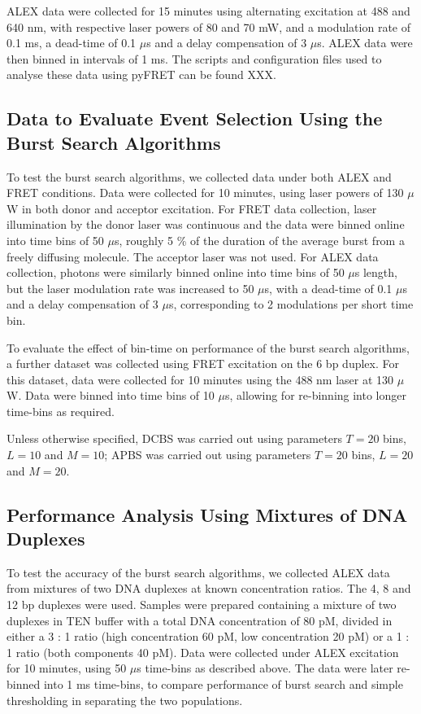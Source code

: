 ALEX data were collected for 15 minutes using alternating excitation at 488 and 640 nm, with respective laser powers of 80 and 70 mW, and a modulation rate of 0.1 ms, a dead-time of 0.1 $\mu$s and a delay compensation of 3 $\mu$s. ALEX data were then binned in intervals of 1 ms. The scripts and configuration files used to analyse these data using pyFRET can be found XXX.

\subsection*{Data to Evaluate Event Selection Using the Burst Search Algorithms}
To test the burst search algorithms, we collected data under both ALEX and FRET conditions. Data were collected for 10 minutes, using laser powers of 130 $\mu$W in both donor and acceptor excitation. For FRET data collection, laser illumination by the donor laser was continuous and the data were binned online into time bins of 50 $\mu$s, roughly 5 \% of the duration of the average burst from a freely diffusing molecule. The acceptor laser was not used. For ALEX data collection, photons were similarly binned online into time bins of 50 $\mu$s length, but the laser modulation rate was increased to 50 $\mu$s, with a dead-time of 0.1 $\mu$s and a delay compensation of 3 $\mu$s, corresponding to 2 modulations per short time bin. 

To evaluate the effect of bin-time on performance of the burst search algorithms, a further dataset was collected using FRET excitation on the 6 bp duplex. For this dataset, data were collected for 10 minutes using the 488 nm laser at 130 $\mu$W. Data were binned into time bins of 10 $\mu$s, allowing for re-binning into longer time-bins as required.

Unless otherwise specified, DCBS was carried out using parameters $T = 20$ bins, $L = 10$ and $M = 10$; APBS was carried out using parameters $T = 20$ bins, $L = 20$ and $M = 20$.

\subsection*{Performance Analysis Using Mixtures of DNA Duplexes}
To test the accuracy of the burst search algorithms, we collected ALEX data from mixtures of two DNA duplexes at known concentration ratios. The 4, 8 and 12 bp duplexes were used. Samples were prepared containing a mixture of two duplexes in TEN buffer with a total DNA concentration of 80 pM, divided in either a 3 : 1 ratio (high concentration 60 pM, low concentration 20 pM) or a 1 : 1 ratio (both components 40 pM). Data were collected under ALEX excitation for 10 minutes, using 50 $\mu$s time-bins as described above. The data were later re-binned into 1 ms time-bins, to compare performance of burst search and simple thresholding in separating the two populations.  


